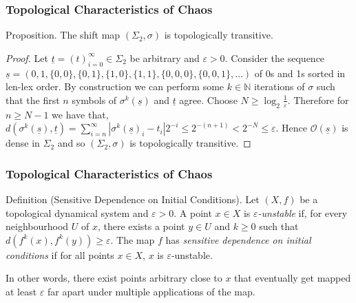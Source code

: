 \documentclass{beamer}
\begin{document}
\begin{frame}
    \frametitle{Topological Characteristics of Chaos}
    \begin{block}{Proposition.}
        The shift map $(\Sigma_2, \sigma)$ is topologically transitive. \cite{devaney}
        \begin{proof}
            Let $\underline{t} = (t)_{i=0}^{\infty} \in \Sigma_2$ be arbitrary and $\varepsilon > 0$. Consider the sequence $\underline{s} = (0, 1, \{0, 0\}, \{0, 1\}, \{1, 0\}, \{1, 1\}, \{0, 0, 0\}, \{0, 0, 1\}, \dots)$ of 0s and 1s sorted in len-lex order. By construction we can perform some $k \in \mathbb{N}$ iterations of $\sigma$ such that the first $n$ symbols of $\sigma^k(\underline{s})$ and $\underline{t}$ agree. Choose $N \geq \log_2{\frac{1}{\varepsilon}}$. Therefore for $n \geq N - 1$ we have that, $d(\sigma^k(\underline{s}), \underline{t}) = \sum_{i = n}^{\infty}|\sigma^k(\underline{s})_i - t_i|2^{-i} \leq 2^{-(n+1)} < 2^{-N} \leq \varepsilon$. Hence $\mathcal{O}(\underline{s})$ is dense in $\Sigma_2$ and so $(\Sigma_2, \sigma)$ is topologically transitive.
        \end{proof}
    \end{block}
\end{frame}

\begin{frame}
    \frametitle{Topological Characteristics of Chaos}
    \begin{block}{Definition (Sensitive Dependence on Initial Conditions).}
        Let $(X, f)$ be a topological dynamical system and $\varepsilon > 0$. A point $x \in X$ is \emph{$\varepsilon$-unstable} if, for every neighbourhood $U$ of $x$, there exists a point $y \in U$ and $k \geq 0$ such that $d\left(f^k(x), f^k(y)\right) \geq \varepsilon$. The map $f$ has \emph{sensitive dependence on initial conditions} if for all points $x \in X$, $x$ is $\varepsilon$-unstable.
    \end{block}
    \vspace{0.5cm}
    In other words, there exist points arbitrary close to $x$ that eventually get mapped at least $\varepsilon$ far apart under multiple applications of the map.
\end{frame}
\end{document}
